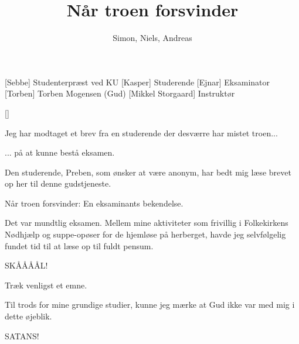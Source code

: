 \documentclass[a4paper,11pt]{article}
\title{Når troen forsvinder}
\author{Simon, Niels, Andreas}
\begin{document}
\maketitle

\begin{roles}
[Sebbe] Studenterpræst ved KU
[Kasper] Studerende
[Ejnar] Eksaminator
[Torben] Torben Mogensen (Gud)
[Mikkel Storgaard] Instruktør
\end{roles}

\begin{props}
[]
\end{props}


\begin{sketch}


 Jeg har modtaget et brev fra en studerende der desværre har mistet
troen...


 ... på at kunne bestå eksamen.

 Den studerende, Preben, som ønsker at være anonym, har bedt mig læse brevet
op her til denne gudstjeneste.


 Når troen forsvinder: En eksaminants bekendelse.


 Det var mundtlig eksamen.  Mellem mine aktiviteter som frivillig i
Folkekirkens Nødhjælp og suppe-opøser for de hjemløse på herberget,
havde jeg selvfølgelig fundet tid til at læse op til fuldt pensum.


 SKÅÅÅÅL!

 Træk venligst et emne.


 Til trods for mine grundige studier, kunne jeg mærke at Gud ikke
var med mig i dette øjeblik.

 SATANS!



\end{sketch}
\end{document}
